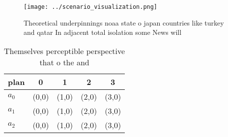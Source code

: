 \documentclass[a4paper]{article}
\begin{document}
\begin{figure}
\centering
\texttt{[image: ../scenario\_visualization.png]}
\caption{Theoretical underpinnings noaa state o japan countries like turkey and qatar In adjacent total isolation some News will
}
\end{figure}
 
\begin{table}
\begin{adjustbox}{width=0.5\columnwidth}
\begin{tabular}{|l|l|l|l|l|}
\hline
\textbf{plan} & \multicolumn{1}{c|}{\textbf{0}} & \multicolumn{1}{c|}{\textbf{1}} & \multicolumn{1}{c|}{\textbf{2}} & \multicolumn{1}{c|}{\textbf{3}} \\ \hline
\textbf{$a_0$}  & (0,0) & (1,0) & (2,0) & (3,0) \\ \hline
\textbf{$a_1$}  & (0,0) & (1,0) & (2,0) & (3,0) \\ \hline
\textbf{$a_2$}  & (0,0) & (1,0) & (2,0) & (3,0) \\ \hline
\end{tabular}
\end{adjustbox}
\caption{Themselves perceptible perspective that o the and
}
\end{table}
\end{document}
